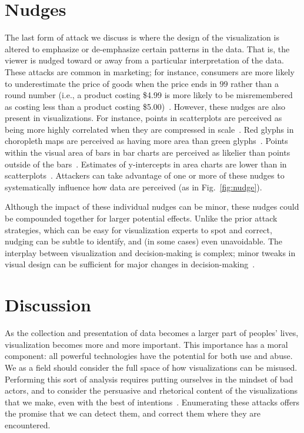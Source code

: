 \documentclass{vgtc}                          %
\begin{document}
\section{Nudges}

The last form of attack we discuss is where the design of the visualization is altered to emphasize or de-emphasize certain patterns in the data. That is, the viewer is nudged toward or away from a particular interpretation of the data. These attacks are common in marketing; for instance, consumers are more likely to underestimate the price of goods when the price ends in $99$ rather than a round number (i.e., a product costing \$4.99 is more likely to be misremembered as costing less than a product costing \$5.00)~\cite{schindler1989effects}. However, these nudges are also present in visualizations. For instance, points in scatterplots are perceived as being more highly correlated when they are compressed in scale~\cite{cleveland1982variables}. Red glyphs in choropleth maps are perceived as having more area than green glyphs~\cite{cleveland1983color}. Points within the visual area of bars in bar charts are perceived as likelier than points outside of the bars~\cite{newman2012bar}. Estimates of y-intercepts in area charts are lower than in scatterplots~\cite{correll2017regression}. Attackers can take advantage of one or more of these nudges to systematically influence how data are perceived (as in Fig.~\ref{fig:nudge}). 

Although the impact of these individual nudges can be minor, these nudges could be compounded together for larger potential effects. Unlike the prior attack strategies, which can be easy for visualization experts to spot and correct, nudging can be subtle to identify, and (in some cases) even unavoidable. The interplay between visualization and decision-making is complex; minor tweaks in visual design can be sufficient for major changes in decision-making~\cite{inbar2007graphical}.

\section{Discussion}

As the collection and presentation of data becomes a larger part of peoples' lives, visualization becomes more and more important. This importance has a moral component: all powerful technologies have the potential for both use and abuse. We as a field should consider the full space of how visualizations can be misused. Performing this sort of analysis requires putting ourselves in the mindset of bad actors, and to consider the persuasive and rhetorical content of the visualizations that we make, even with the best of intentions~\cite{hullman2011visualization}. Enumerating these attacks offers the promise that we can detect them, and correct them where they are encountered.
\end{document}
